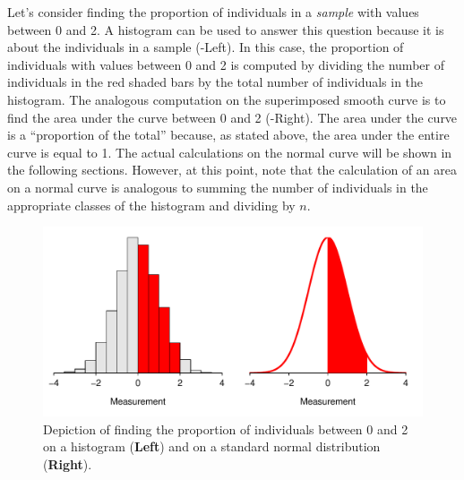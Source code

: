 \documentclass[10pt,openany]{book}\usepackage[]{graphicx}\usepackage[]{color}
\newenvironment{knitrout}{}{} %
\begin{document}
Let's consider finding the proportion of individuals in a \textit{sample} with values between 0 and 2.  A histogram can be used to answer this question because it is about the individuals in a sample (-Left).  In this case, the proportion of individuals with values between 0 and 2 is computed by dividing the number of individuals in the red shaded bars by the total number of individuals in the histogram.  The analogous computation on the superimposed smooth curve is to find the area under the curve between 0 and 2 (-Right).  The area under the curve is a ``proportion of the total'' because, as stated above, the area under the entire curve is equal to 1.  The actual calculations on the normal curve will be shown in the following sections.  However, at this point, note that the calculation of an area on a normal curve is analogous to summing the number of individuals in the appropriate classes of the histogram and dividing by $n$.

\begin{knitrout}
\color{fgcolor}\begin{figure}[hbtp]

{\centering \includegraphics[width=.8\linewidth]{Figs/NormDistShade-1} 

}

\caption[Depiction of finding the proportion of individuals between 0 and 2 on a histogram (\textbf{Left}) and on a standard normal distribution (\textbf{Right})]{Depiction of finding the proportion of individuals between 0 and 2 on a histogram (\textbf{Left}) and on a standard normal distribution (\textbf{Right}).}\label{fig:NormDistShade}
\end{figure}


\end{knitrout}

\end{document}

